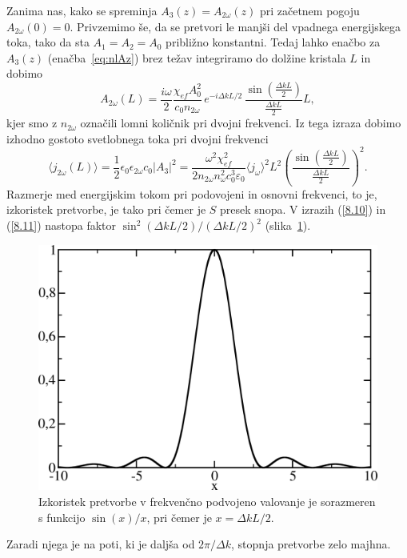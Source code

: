 \documentclass[11pt,fleqn]{book} %
\begin{document}
Zanima nas, kako se spreminja $A_{3}(z) = A_{2\omega}(z)$ pri začetnem pogoju $A_{2\omega}(0)=0$.
Privzemimo še, da se pretvori le manjši del vpadnega energijskega toka,
tako da sta $A_{1}=A_{2}=A_0$ približno konstantni. Tedaj lahko
enačbo za $A_{3}(z)$ (enačba~\ref{eq:nlAz}) brez težav integriramo do dolžine kristala $L$ in dobimo
\begin{equation}
A_{2\omega}(L)=\frac{i\omega}{2}\frac{\chi_{ef} A_0^2}{c_0 n_{2\omega}}
\,e^{-i\Delta kL/2}\, \frac{\sin\left(\frac{\Delta k L}{2}\right)}{\frac{\Delta kL}{2}}L,
\label{8.9}
\end{equation}
kjer smo z $n_{2\omega}$ označili lomni količnik pri dvojni frekvenci.
Iz tega izraza dobimo izhodno gostoto svetlobnega toka pri dvojni
frekvenci 
\begin{equation}
\langle j_{2\omega}(L) \rangle=\frac{1}{2}\epsilon_{0}\epsilon_{2\omega}c_0|A_3|^2 = 
\frac{\omega^2 \chi_{ef}^2}{2 n_{2\omega} n_\omega^2c_0^3\varepsilon_0}\langle j_\omega\rangle^2 L^2
\left(\frac{\sin\left(\frac{\Delta k L}{2}\right)}{\frac{\Delta kL}{2}}\right)^2.
\label{8.10}
\end{equation}
Razmerje med energijskim tokom pri podovojeni in osnovni frekvenci,
to je, izkoristek pretvorbe, je tako
pri čemer je $S$ presek snopa. V izrazih (\ref{8.10}) in (\ref{8.11}) nastopa 
faktor $\sin^{2}(\Delta kL/2)/(\Delta kL/2)^{2}$ (slika~\ref{fig:shg2}). 
\begin{figure}[h]
\centering
\includegraphics[width=8truecm]{slike/08_shg2.png}
\caption{Izkoristek pretvorbe v frekvenčno podvojeno valovanje je sorazmeren s funkcijo $\sin(x)/x$,
pri čemer je $x = \Delta k L/2$.}
\label{fig:shg2}
\end{figure}
Zaradi njega je na poti, ki je daljša od $2\pi /\Delta k$, stopnja pretvorbe zelo majhna.
\end{document}
